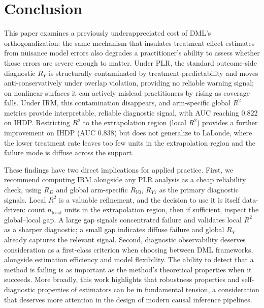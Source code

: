 \documentclass[12pt]{article}
\begin{document}
\section{Conclusion}

This paper examines a previously underappreciated cost of DML's orthogonalization: the same mechanism that insulates treatment-effect estimates from nuisance model errors also degrades a practitioner's ability to assess whether those errors are severe enough to matter. Under PLR, the standard outcome-side diagnostic $R_Y$ is structurally contaminated by treatment predictability and moves anti-conservatively under overlap violation, providing no reliable warning signal; on nonlinear surfaces it can actively mislead practitioners by rising as coverage falls. Under IRM, this contamination disappears, and arm-specific global $R^2$ metrics provide interpretable, reliable diagnostic signal, with AUC reaching 0.822 on IHDP. Restricting $R^2$ to the extrapolation region (local $R^2$) provides a further improvement on IHDP (AUC 0.838) but does not generalize to LaLonde, where the lower treatment rate leaves too few units in the extrapolation region and the failure mode is diffuse across the support.

These findings have two direct implications for applied practice. First, we recommend computing IRM alongside any PLR analysis as a cheap reliability check, using $R_D$ and global arm-specific $R_{Y0}$, $R_{Y1}$ as the primary diagnostic signals. Local $R^2$ is a valuable refinement, and the decision to use it is itself data-driven: count $n_{\text{local}}$ units in the extrapolation region, then if sufficient, inspect the global--local gap. A large gap signals concentrated failure and validates local $R^2$ as a sharper diagnostic; a small gap indicates diffuse failure and global $R_Y$ already captures the relevant signal. Second, diagnostic observability deserves consideration as a first-class criterion when choosing between DML frameworks, alongside estimation efficiency and model flexibility. The ability to detect that a method is failing is as important as the method's theoretical properties when it succeeds. More broadly, this work highlights that robustness properties and self-diagnostic properties of estimators can be in fundamental tension, a consideration that deserves more attention in the design of modern causal inference pipelines.
\end{document}
